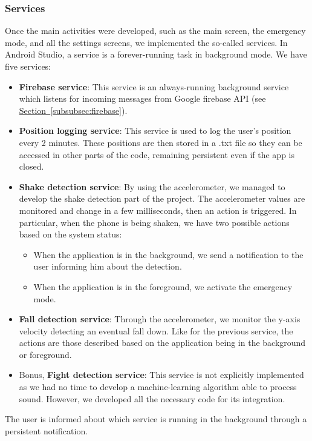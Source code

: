 \documentclass[12pt]{article}
\begin{document}
\subsubsection{Services}
\label{subsubsec:services}
Once the main activities were developed, such as the main screen, the 
emergency mode, and all the settings screens, we implemented the 
so-called services. In Android Studio, a service is a forever-running 
task in background mode. We have five services:
\begin{itemize}
    \item \textbf{Firebase service}: This service is an always-running 
    background service which listens for incoming messages from 
    Google firebase API (see \hyperref[subsubsec:firebase]{Section~\ref*{subsubsec:firebase}}).
    \item \textbf{Position logging service}: This service is used to log 
    the user's position every 2 minutes. These positions are then stored 
    in a .txt file so they can be accessed in other parts of the code, 
    remaining persistent even if the app is closed.
    \item \textbf{Shake detection service}: By using the accelerometer,
    we managed to develop the shake detection part of the project. 
    The accelerometer values are monitored and change in a few 
    milliseconds, then an action is triggered. In particular, when the 
    phone is being shaken, we have two possible actions based on the
    system status:
    \begin{itemize}
        \item When the application is in the background, we send a 
        notification to the user informing him about the detection.
        \item When the application is in the foreground, we activate the 
        emergency mode.
    \end{itemize}
    \item \textbf{Fall detection service}: Through the accelerometer, 
    we monitor the y-axis velocity detecting an eventual fall down. 
    Like for the previous service, the actions are those described 
    based on the application being in the background or foreground.
    \item Bonus, \textbf{Fight detection service}: This service is not 
    explicitly implemented as we had no time to develop a machine-learning 
    algorithm able to process sound. However, we developed all the 
    necessary code for its integration.
\end{itemize}
The user is informed about which service is running in the background 
through a persistent notification.
\end{document}
